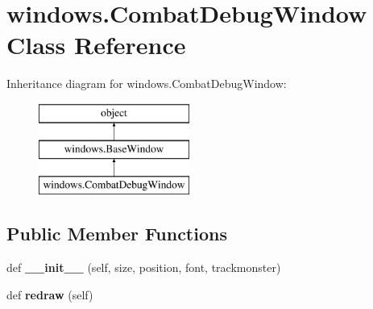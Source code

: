 \hypertarget{classwindows_1_1_combat_debug_window}{}\section{windows.\+Combat\+Debug\+Window Class Reference}
\label{classwindows_1_1_combat_debug_window}
Inheritance diagram for windows.\+Combat\+Debug\+Window\+:\begin{figure}[H]
\begin{center}
\leavevmode
\includegraphics[height=3.000000cm]{classwindows_1_1_combat_debug_window}
\end{center}
\end{figure}
\subsection*{Public Member Functions}
\begin{DoxyCompactItemize}
\item 
\hypertarget{classwindows_1_1_combat_debug_window_a8c6d9d4157c72ea25d50766783d66ae5}{}def {\bfseries \+\_\+\+\_\+init\+\_\+\+\_\+} (self, size, position, font, trackmonster)\label{classwindows_1_1_combat_debug_window_a8c6d9d4157c72ea25d50766783d66ae5}

\item 
\hypertarget{classwindows_1_1_combat_debug_window_abc485ff31d1a8db893c37075e2e2d0b6}{}def {\bfseries redraw} (self)\label{classwindows_1_1_combat_debug_window_abc485ff31d1a8db893c37075e2e2d0b6}

\end{DoxyCompactItemize}
